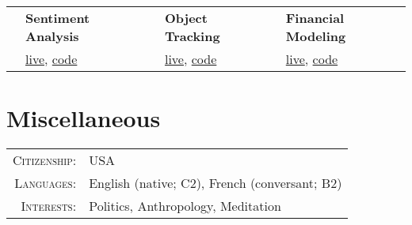 \documentclass{article}
\begin{document}
	\begin{tabular}{r p{4cm} r p{4cm} r p{4cm} }
	
		\multirow{2}{*}{\Huge \color{starcolor}{\faSmileO}} &
		\textbf{Sentiment Analysis} & 
		\multirow{2}{*}{\Huge \color{starcolor}{\faRocket}} &
		\textbf{Object Tracking} &
		\multirow{2}{*}{\Huge \color{starcolor}{\faLineChart }} &
		\textbf{Financial Modeling}\\
		
		&
		\href{https://erickramer.xyz/sentiment/}{live}, \href{https://github.com/erickramer/sentiment}{code} & &
		\href{https://erickramer.xyz/asteroids}{live}, \href{https://github.com/erickramer/personal_site_flask/blob/master/elm/Asteroids.elm}{code} & &
		\href{https://eransom.shinyapps.io/financial_planning/}{live}, \href{https://github.com/erickramer/financial_dashboard}{code} \\	

		
	\end{tabular}

\section{Miscellaneous}

	\begin{tabular}{r l}
		\textsc{Citizenship}: & USA \\
		\textsc{Languages}: &  English (native; C2), French (conversant; B2)\\
		\textsc{Interests}: & Politics, Anthropology, Meditation
	\end{tabular}
\end{document}
